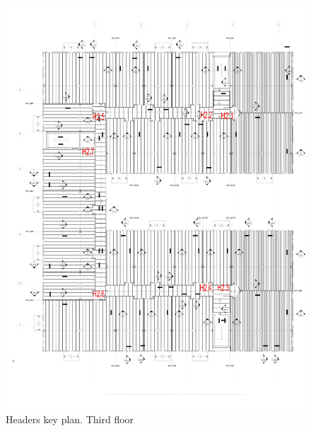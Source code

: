\begin{figure}
  \begin{center}
  \includegraphics[width=120mm]{figures/headers_key_plan_3rd_floor}
  \end{center}
  \caption{Headers key plan. Third floor}\label{fg_headers_key_plan_3rd_floor}
\end{figure}

